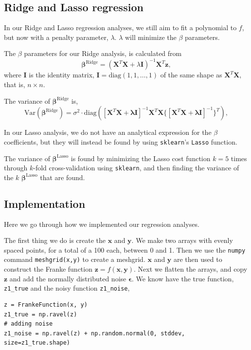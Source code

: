 \documentclass[a4paper,10pt,english]{article}
\def\code#1{\texttt{#1}} %
\begin{document}
\subsection{Ridge and Lasso regression}
In our Ridge and Lasso regression analyses, we still aim to fit a polynomial to $f$, but now with a penalty parameter, $\lambda$. $\lambda$ will minimize the $\beta$ parameters.

The $\beta$ parameters for our Ridge analysis, is calculated from
\begin{equation}
\bm{{\beta}}^\mathrm{Ridge} = (\bm{{X}}^T\bm{{X}} + \lambda \bm{{I}})^{-1}\bm{{X}}^T\bm{{z}},
\end{equation}
where $\bm{{I}}$ is the identity matrix, $\bm{{I}} = \mathrm{diag}(1,1,\dots , 1)$ of the same shape as $\bm{{X}}^T\bm{{X}}$, that is, $n\times n$.

The variance of $\bm{{\beta}}^\mathrm{Ridge}$ is,
\begin{equation}
\mathrm{Var}(\bm{{\beta}}^\mathrm{Ridge}) = \sigma^2\cdot\mathrm{diag}([\bm{{X}}^T\bm{{X} + \lambda \bm{I}}]^{-1}\bm{{X}}^T\bm{{X}}\{[\bm{{X}}^T\bm{{X} + \lambda \bm{I}}]^{-1}\}^T),
\end{equation}

In our Lasso analysis, we do not have an analytical expression for the $\beta$ coefficients, but they will instead be found by using \code{sklearn}'s \code{Lasso} function.

The variance of $\bm{\beta}^\mathrm{Lasso}$ is found by minimizing the Lasso cost function $k=5$ times through $k$-fold cross-validation using \code{sklearn}, and then finding the variance of the $k$ $\bm{\beta}^\mathrm{Lasso}$ that are found.%
 
%
%
\subsection{Implementation}\label{sec:implementation}
Here we go through how we implemented our regression analyses.

The first thing we do is create the $\bm{x}$ and $\bm{y}$. We make two arrays with evenly spaced points, for a total of a 100 each, between 0 and 1. Then we use the \code{numpy} command \code{meshgrid(x,y)} to create a meshgrid. $\bm{x}$ and $\bm{y}$ are then used to construct the Franke function $\bm{z}=f(\bm{x}, \bm{y})$. Next we flatten the arrays, and copy $\bm{z}$ and add the normally distributed noise $\bm{\epsilon}$. We know have the true function, \code{z1\_true} and the noisy function \code{z1\_noise},
\begin{verbatim}
z = FrankeFunction(x, y)
z1_true = np.ravel(z)
# adding noise
z1_noise = np.ravel(z) + np.random.normal(0, stddev, size=z1_true.shape) 
\end{verbatim}
\end{document}
